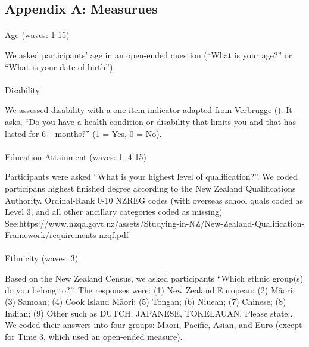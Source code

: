 \documentclass[
  singlecolumn]{article}
\makeatletter
\let\oldparagraph\paragraph
\renewcommand{\paragraph}{
    \@ifstar
      \xxxParagraphStar
      \xxxParagraphNoStar
  }
\newcommand{\xxxParagraphStar}[1]{\oldparagraph*{#1}\mbox{}}
\newcommand{\xxxParagraphNoStar}[1]{\oldparagraph{#1}\mbox{}}
\makeatother
\begin{document}
\newpage{}

\subsection{Appendix A: Measurues}\label{appendix-measures}

\paragraph{Age (waves: 1-15)}\label{age-waves-1-15}

We asked participants' age in an open-ended question (``What is your
age?'' or ``What is your date of birth'').

\paragraph{Disability}\label{disability}

We assessed disability with a one-item indicator adapted from Verbrugge
(). It asks, ``Do you have a health
condition or disability that limits you and that has lasted for 6+
months?'' (1 = Yes, 0 = No).

\paragraph{Education Attainment (waves: 1,
4-15)}\label{education-attainment-waves-1-4-15}

Participants were asked ``What is your highest level of
qualification?''. We coded participans highest finished degree according
to the New Zealand Qualifications Authority. Ordinal-Rank 0-10 NZREG
codes (with overseas school quals coded as Level 3, and all other
ancillary categories coded as missing)
See:https://www.nzqa.govt.nz/assets/Studying-in-NZ/New-Zealand-Qualification-Framework/requirements-nzqf.pdf

\paragraph{Ethnicity (waves: 3)}\label{ethnicity-waves-3}

Based on the New Zealand Census, we asked participants ``Which ethnic
group(s) do you belong to?''. The responses were: (1) New Zealand
European; (2) Māori; (3) Samoan; (4) Cook Island Māori; (5) Tongan; (6)
Niuean; (7) Chinese; (8) Indian; (9) Other such as DUTCH, JAPANESE,
TOKELAUAN. Please state:. We coded their answers into four groups:
Maori, Pacific, Asian, and Euro (except for Time 3, which used an
open-ended measure).
\end{document}
